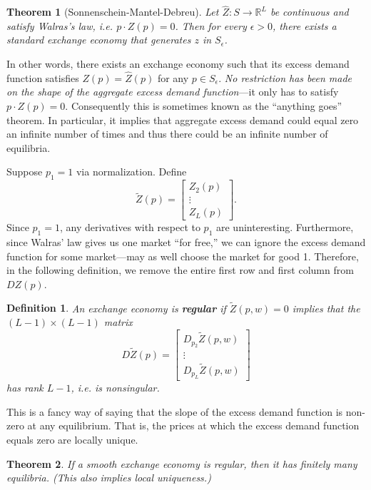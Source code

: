 \documentclass[11pt, twocolumn]{article}
\newcommand{\R}{\mathbb{R}}
\newtheorem{theorem}{Theorem}
\newtheorem{definition}{Definition}
\theoremstyle{definition}
\begin{document}
\begin{theorem}[Sonnenschein-Mantel-Debreu]
	Let $\hat{Z} : S \rightarrow \R^L$ be continuous and satisfy Walras's law, i.e. $p \cdot Z(p)=0$. Then for every $\epsilon > 0$, there exists a standard exchange economy that generates $z$ in $S_{\epsilon}$. 
\end{theorem}

In other words, there exists an exchange economy such that its excess demand function satisfies $Z(p) = \hat{Z}(p)$ for any $p \in S_{\epsilon}$. \emph{No restriction has been made on the shape of the aggregate excess demand function}---it only has to satisfy $p \cdot Z(p)=0$. Consequently this is sometimes known as the ``anything goes'' theorem. In particular, it implies that aggregate excess demand could equal zero an infinite number of times and thus there could be an infinite number of equilibria. 

Suppose $p_1=1$ via normalization. Define 
	\[ \tilde{Z}(p) = \begin{bmatrix} 
			Z_2(p)\\
			\vdots \\
			Z_L(p)
		\end{bmatrix}.		\]	 
		Since $p_1=1$, any derivatives with respect to $p_1$ are uninteresting. Furthermore, since Walras' law gives us one market ``for free,'' we can ignore the excess demand function for some market---may as well choose the market for good 1. Therefore, in the following definition, we remove the entire first row and first column from $DZ(p)$. 
		
\begin{definition}		An exchange economy is \textbf{regular} if $\tilde{Z}(p,w)=0$ implies that the $(L-1) \times (L-1)$ matrix
\[	D \tilde{Z}(p) =\begin{bmatrix}
		D_{p_2} \tilde{Z}(p,w) \\
		\vdots \\
		D_{p_L} \tilde{Z}(p,w)
	\end{bmatrix}
\]
has rank $L-1$, i.e. is nonsingular. 
\end{definition}
This is a fancy way of saying that the slope of the excess demand function is non-zero at any equilibrium. That is, the prices at which the excess demand function equals zero are locally unique.


\begin{theorem}
	If a smooth exchange economy is regular, then it has finitely many equilibria. (This also implies local uniqueness.)
\end{theorem}
\end{document}
